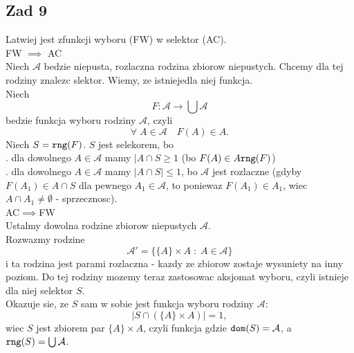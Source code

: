 \documentclass{article}
\begin{document}
\subsection*{Zad 9}
Latwiej jest zfunkcji wyboru (FW) w selektor (AC).\bigskip\\
{\color{acc}FW $\implies$ AC}\medskip\\
Niech $\mathcal{A}$ bedzie niepusta, rozlaczna rodzina zbiorow niepustych. Chcemy dla tej rodziny znalezc slektor. Wiemy, ze istniejedla niej funkcja.\smallskip\\
Niech 
$$F:\mathcal{A}\to\bigcup\mathcal{A}$$
bedzie funkcja wyboru rodziny $\mathcal{A}$, czyli
$$\forall\;A\in\mathcal{A}\quad F(A)\in A.$$
Niech $S = \texttt{rng}(F)$. $S$ jest selekorem, bo\medskip\\
. dla dowolnego $A\in\mathcal{A}$ mamy $|A\cap S\geq 1$ (bo $F(A)\in A\texttt{rng}(F)$)\smallskip\\
. dla dowolnego $A\in\mathcal{A}$ mamy $|A\cap S|\leq 1$, bo $\mathcal{A}$ jest rozlaczne (gdyby $F(A_1)\in A\cap S$ dla pewnego $A_1\in\mathcal{A}$, to poniewaz $F(A_1)\in A_1$, wiec $A\cap A_1\neq\emptyset$ - sprzecznosc).\bigskip\\
{\color{acc}AC$\implies$FW}\medskip\\
Ustalmy dowolna rodzine zbiorow niepustych $\mathcal{A}$. \smallskip\\
Rozwazmy rodzine
$$\mathcal{A}'=\{\{A\}\times A\;:\;A\in\mathcal{A}\}$$
i ta rodzina jest parami rozlaczna - kazdy ze zbiorow zostaje wysuniety na inny poziom. Do tej rodziny mozemy teraz zastosowac aksjomat wyboru, czyli istnieje dla niej selektor $S$.\smallskip\\
Okazuje sie, ze $S$ sam w sobie jest funkcja wyboru rodziny $\mathcal{A}$:
$$|S\cap (\{A\}\times A)|=1,$$
wiec $S$ jest zbiorem par $\{A\}\times A$, czyli funkcja gdzie $\texttt{dom}(S)= \mathcal{A}$, a $\texttt{rng}(S)=\bigcup\mathcal{A}$.
\end{document}
